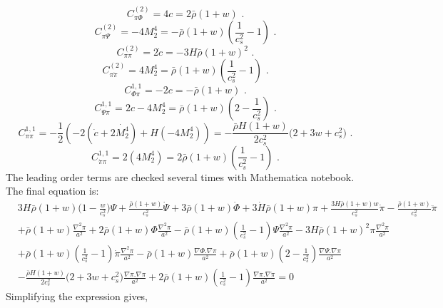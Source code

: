 \documentclass[a4paper,11pt]{article}
\def\be{\begin{equation}}
\def\ee{\end{equation}}
\begin{document}
\be
C^{(2)}_{\pi \Phi}=4c =  2 \bar{\rho} (1+w) \text{ .}
\ee
\be
C^{(2)}_{\pi \Psi}= -4 M_2^4=-\bar{\rho} (1+w) (\frac{1}{c_s^2}-1)\text{ .}
\ee
\be
C^{(2)}_{\pi \pi}=   2 \dot{c}=-3 H  \bar{\rho} (1+w) ^2   \text{ .}
\ee
\be
C^{(2)}_{\pi \dot{\pi}}=  4 M_2^4=\bar{\rho} (1+w) (\frac{1}{c_s^2}-1)  \text{ .}
\ee
\be
C^{1,1}_{\Phi \pi}= -   2c =-   \bar{\rho} (1+w)      \text{ .}
\ee
\be
C^{1,1}_{\Psi \pi}=  2 c- 4 M_2^4 =\bar{\rho} (1+w) (2-\frac{1}{c_s^2})      \text{ .}
\ee
\be
C^{1,1}_{\pi \pi}= -\frac{1}{2} \left (  - 2 (\dot{c} +2  \dot{M_2^4} )+H (-4 M_2^4 )  \right )=-\frac{\bar{\rho} H (1+w)} {2 c_s^2} \Big(2+3w+c_s^2  \Big) 		\text{ .}
\ee
\be
C^{1,1}_{\dot{\pi} \pi}=   2 (4 M_2^4)=2\bar{\rho} (1+w) (\frac{1}{c_s^2}-1) 	\text{ .}
\ee
The leading order terms are checked several times with Mathematica notebook. \\
The final equation is:
\begin{align} 
 &3 {H} \bar{\rho} (1+w) \Big( 1- \frac{w}{c_s^2} \Big )
 \Psi + \frac{ \bar{\rho} (1+w)}{c_s^2} \dot{\Psi} + 3 \bar{\rho} (1+w) \dot{\Phi} +3 \dot{H} \bar{\rho} (1+w) \pi + \frac{3 {H} \bar{\rho} (1+w) w}{c_s^2} \dot{\pi} -\frac{  \bar{\rho} (1+w)}{c_s^2} \ddot{\pi} 
 \nonumber \\ 
 &
+ \bar{\rho} (1+w) \frac{\nabla^2 \pi}{a^2}
  +2  \bar{\rho} (1+w) \Phi  \frac{\nabla^2 \pi }{a^2}   
  -   \bar{\rho} (1+w) (\frac{1}{c_s^2}-1)  \Psi \frac{\nabla^2 \pi }{a^2}   
  - 3 H \bar{\rho} (1+w)^2 \pi \frac{\nabla^2 \pi }{a^2}  
      \nonumber \\ &
        +  \bar{\rho} (1+w) (\frac{1}{c_s^2}-1)    \dot{\pi } \frac{\nabla^2 {\pi }}{a^2}   
             -\bar{\rho} (1+w)  \frac{\nabla  \Phi . \nabla \pi }{a^2} 
        +\bar{\rho} (1+w) (2-\frac{1}{c_s^2}) \frac{\nabla  \Psi . \nabla \pi }{a^2}   
   \nonumber \\ &
 -\frac{\bar{\rho} H (1+w)} {2 c_s^2} \Big(2+3w+c_s^2  \Big)\frac{\nabla  \pi . \nabla \pi } {a^2}
    +2  \bar{\rho} (1+w) (\frac{1}{c_s^2}-1)\frac{\nabla  \pi . \nabla \dot{\pi} } {a^2}
     =0
  \end{align}
Simplifying the expression gives,
\end{document}
